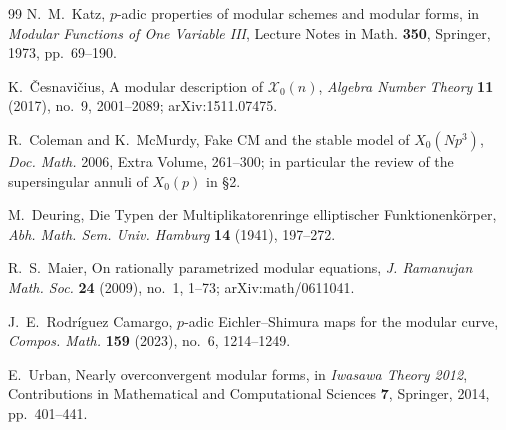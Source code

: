 \documentclass[11pt]{article}
\theoremstyle{definition}
\theoremstyle{remark}
\begin{document}
\begin{thebibliography}{99}
N.~M.~Katz,
\newblock $p$-adic properties of modular schemes and modular forms,
\newblock in \emph{Modular Functions of One Variable III}, Lecture Notes in
Math. \textbf{350}, Springer, 1973, pp.~69--190.


K.~\v{C}esnavi\v{c}ius,
\newblock A modular description of $\mathscr X_0(n)$,
\newblock \emph{Algebra Number Theory} \textbf{11} (2017), no.~9, 2001--2089;
\newblock arXiv:1511.07475.

R.~Coleman and K.~McMurdy,
\newblock Fake CM and the stable model of $X_0(Np^3)$,
\newblock \emph{Doc. Math.} 2006, Extra Volume, 261--300; in particular the
review of the supersingular annuli of $X_0(p)$ in \S2.

M.~Deuring,
\newblock Die Typen der Multiplikatorenringe elliptischer Funktionenk\"orper,
\newblock \emph{Abh. Math. Sem. Univ. Hamburg} \textbf{14} (1941), 197--272.

R.~S.~Maier,
\newblock On rationally parametrized modular equations,
\newblock \emph{J. Ramanujan Math. Soc.} \textbf{24} (2009), no.~1, 1--73;
\newblock arXiv:math/0611041.

J.~E.~Rodr\'iguez Camargo,
\newblock $p$-adic Eichler--Shimura maps for the modular curve,
\newblock \emph{Compos. Math.} \textbf{159} (2023), no.~6, 1214--1249.

E.~Urban,
\newblock Nearly overconvergent modular forms,
\newblock in \emph{Iwasawa Theory 2012}, Contributions in Mathematical and
Computational Sciences \textbf{7}, Springer, 2014, pp.~401--441.

\end{thebibliography}
\end{document}
